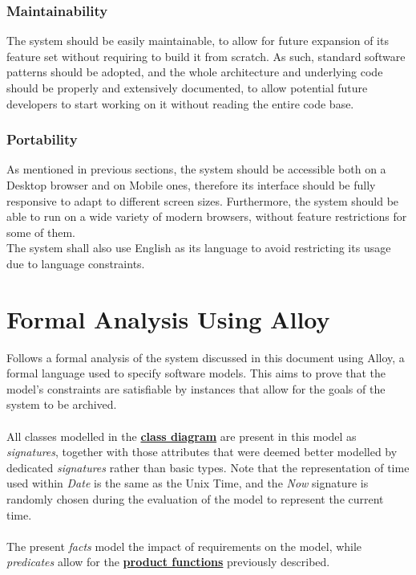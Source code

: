 \documentclass[11pt]{article}
\begin{document}
\subsubsection{Maintainability}
The system should be easily maintainable, to allow for future expansion of its feature set without requiring to build it from scratch. As such, standard software patterns should be adopted, and the whole architecture and underlying code should be properly and extensively documented, to allow potential future developers to start working on it without reading the entire code base.

\subsubsection{Portability}
As mentioned in previous sections, the system should be accessible both on a Desktop browser and on Mobile ones, therefore its interface should be fully responsive to adapt to different screen sizes. Furthermore, the system should be able to run on a wide variety of modern browsers, without feature restrictions for some of them. \\
The system shall also use English as its language to avoid restricting its usage due to language constraints.

\newpage

\section{Formal Analysis Using Alloy}
\label{section:alloy}

Follows a formal analysis of the system discussed in this document using Alloy, a formal language used to specify software models. This aims to prove that the model's constraints are satisfiable by instances that allow for the goals of the system to be archived.\\
\\
All classes modelled in the \hyperref[subsection:classDiagram]{\textbf{class diagram}} are present in this model as \textit{signatures}, together with those attributes that were deemed better modelled by dedicated \textit{signatures} rather than basic types. Note that the representation of time used within \textit{Date} is the same as the Unix Time, and the \textit{Now} signature is randomly chosen during the evaluation of the model to represent the current time. \\
\\
The present \textit{facts} model the impact of requirements on the model, while \textit{predicates} allow for the \hyperref[subsec:prodfunctions]{\textbf{product functions}} previously described. \\
\end{document}
